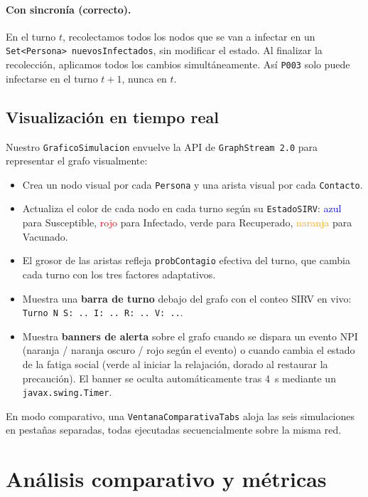 \documentclass[spanish,notitlepage,letterpaper, 12pt]{article}
\begin{document}
\paragraph{Con sincron\'ia (correcto).} En el turno $t$, recolectamos todos los nodos que se van a infectar en un \texttt{Set<Persona> nuevosInfectados}, sin modificar el estado. Al finalizar la recolecci\'on, aplicamos todos los cambios simult\'aneamente. As\'i \texttt{P003} solo puede infectarse en el turno $t+1$, nunca en $t$.

\subsection{Visualizaci\'on en tiempo real}

Nuestro \texttt{GraficoSimulacion} envuelve la API de \texttt{GraphStream 2.0} para representar el grafo visualmente:
\begin{itemize}
    \item Crea un nodo visual por cada \texttt{Persona} y una arista visual por cada \texttt{Contacto}.
    \item Actualiza el color de cada nodo en cada turno seg\'un su \texttt{EstadoSIRV}: \textcolor{blue}{azul} para Susceptible, \textcolor{red}{rojo} para Infectado, \textcolor{green!50!black}{verde} para Recuperado, \textcolor{orange}{naranja} para Vacunado.
    \item El grosor de las aristas refleja \texttt{probContagio} efectiva del turno, que cambia cada turno con los tres factores adaptativos.
    \item Muestra una \textbf{barra de turno} debajo del grafo con el conteo SIRV en vivo: \texttt{Turno N \quad S: .. \quad I: .. \quad R: .. \quad V: ..}.
    \item Muestra \textbf{banners de alerta} sobre el grafo cuando se dispara un evento NPI (naranja / naranja oscuro / rojo seg\'un el evento) o cuando cambia el estado de la fatiga social (verde al iniciar la relajaci\'on, dorado al restaurar la precauci\'on). El banner se oculta autom\'aticamente tras 4~s mediante un \texttt{javax.swing.Timer}.
\end{itemize}

En modo comparativo, una \texttt{VentanaComparativaTabs} aloja las seis simulaciones en pesta\~nas separadas, todas ejecutadas secuencialmente sobre la misma red.

\newpage
\section{An\'alisis comparativo y m\'etricas}
\label{sec:analisis}
\end{document}
